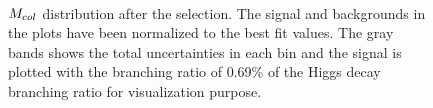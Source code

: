 \begin{figure}[htbp] 
     \centering
     \\
     \caption[$\mcol$ distribution after the selection in $\Hehad$ analysis]{ $\mcol$ distribution after the selection. The signal and backgrounds in the plots have been normalized to the best fit values. The gray bands shows the total uncertainties in each bin and the signal is plotted with the branching ratio of 0.69\% of the Higgs decay branching ratio for visualization purpose. }
     \label{fig:etaubdtbasedpostfit}
\end{figure}



